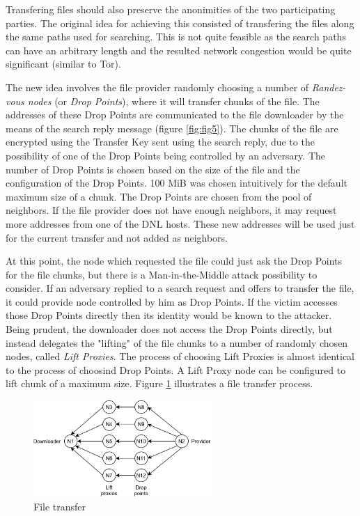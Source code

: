 Transfering files should also preserve the anonimities of the two participating 
parties. The original idea for achieving this consisted of transfering the 
files along the same paths used for searching. This is not quite feasible as 
the search paths can have an arbitrary length and the resulted network 
congestion would be quite significant (similar to Tor).

The new idea involves the file provider randomly choosing a number of 
\textit{Randez-vous nodes} (or \textit{Drop Points}), where it will transfer 
chunks of the file. The addresses of these Drop Points are communicated to the 
file downloader by the means of the search reply message (figure 
\ref{fig:fig5}). The chunks of the file are encrypted using the Transfer Key 
sent using the search reply, due to the possibility of one of the Drop Points 
being controlled by an adversary. The number of Drop Points is chosen based on 
the size of the file and the configuration of the Drop Points. 100 MiB was 
chosen intuitively for the default maximum size of a chunk. The Drop Points are 
chosen from the pool of neighbors. If the file provider does not have enough 
neighbors, it may request more addresses from one of the DNL hosts. These new 
addresses will be used just for the current transfer and not added as neighbors.

At this point, the node which requested the file could just ask the Drop Points 
for the file chunks, but there is a Man-in-the-Middle attack possibility to 
consider. If an adversary replied to a search request and offers to transfer 
the file, it could provide node controlled by him as Drop Points. If the victim 
accesses those Drop Points directly then its identity would be known to the 
attacker. Being prudent, the downloader does not access the Drop Points 
directly, but instead delegates the "lifting" of the file chunks to a number of 
randomly chosen nodes, called \textit{Lift Proxies}. The process of choosing 
Lift Proxies is almost identical to the process of choosind Drop Points. A Lift 
Proxy node can be configured to lift chunk of a maximum size. Figure 
\ref{fig:fig7} illustrates a file transfer process.

\begin{figure}
    \centering
    \includegraphics[width=0.6\textwidth]{figures/fig7}
    \caption{File transfer}
    \label{fig:fig7}
\end{figure}
